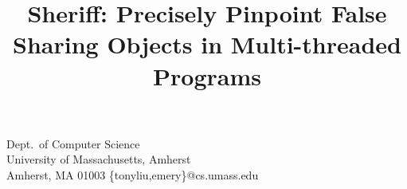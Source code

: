 \documentclass[10pt]{sigplanconf}
\begin{document}

\title{\Large \bf Sheriff: Precisely Pinpoint False Sharing Objects in Multi-threaded Programs}

{Dept.\ of Computer Science \\ University of Massachusetts, Amherst \\
Amherst, MA 01003} {\{tonyliu,emery\}@cs.umass.edu}

\maketitle

\begin{comment}
Story:
Multi-core processors or NUMA are now widely used in order to avoid the physical limits of hardware. 
Multi-threaded is considered as one way to take full advantage of those computation resources. Unfornately, 
writing efficient multi-threaded program is not an easy task; 
false sharing problem can reduce the performance greatly, 
even worse, one program with serious false sharing problem can run slower on multi-core machine that that on 
on single-core machine with the same cpu frequency of every core.

This paper presents Sheriff, a system to detect those false sharing problem in multi-threaded c/c++ programs. 
Comparing to previous tool, Sheriff has a very low performance overhead, 
averagely the performance overhead is about 15\% in our experiments. 
For most programs, Sheriff can run almost the same speed or even faster than original program
using pthreads library. 
The second advantage of Sheriff is that there is no false positives at all. 
The false sharing problems reported by Sheriff are actual false sharing problems.

The third adanvatage of Sheriff is that Sheriff can pinpoint the code to cause the false sharing problems. 
For heap objects, Sheriff can point out the allocation site, 
then it is easy for programmer to fix the false sharing problem given the callsite information,
even for some one that are not familiar with the code. 
For global objects, Sheriff can point out those objects' name and length information which has false sharing problem.


\end{comment}
\end{document}
